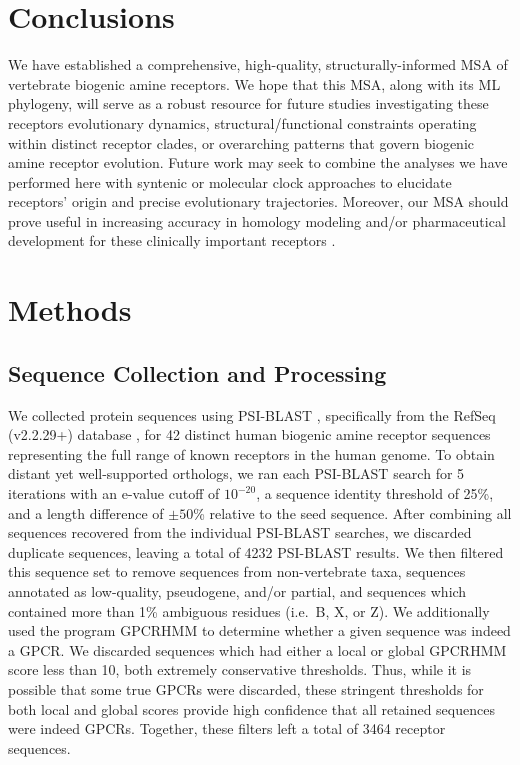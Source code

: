 \documentclass[fleqn,10pt]{wlpeerj}
\begin{document}
\section*{Conclusions}

We have established a comprehensive, high-quality, structurally-informed MSA of vertebrate biogenic amine receptors. We hope that this MSA, along with its ML phylogeny, will serve as a robust resource for future studies investigating these receptors evolutionary dynamics, structural/functional constraints operating within distinct receptor clades, or overarching patterns that govern biogenic amine receptor evolution. Future work may seek to combine the analyses we have performed here with syntenic or molecular clock approaches to elucidate receptors' origin and precise evolutionary trajectories. Moreover, our MSA should prove useful in increasing accuracy in homology modeling and/or pharmaceutical development for these clinically important receptors \citep{Kristiansen2004,Ishiguro2004,Eversetal2005,Masonetal2012}.




\section*{Methods}

\subsection*{Sequence Collection and Processing}
We collected protein sequences using PSI-BLAST \citep{psiblast}, specifically from the RefSeq (v2.2.29+) database \citep{refseq}, for 42 distinct human biogenic amine receptor sequences representing the full range of known receptors in the human genome. To obtain distant yet well-supported orthologs, we ran each PSI-BLAST search for 5 iterations with an e-value cutoff of $10^{-20}$, a sequence identity threshold of 25\%, and a length difference of $\pm50$\% relative to the seed sequence. After combining all sequences recovered from the individual PSI-BLAST searches, we discarded duplicate sequences, leaving a total of 4232 PSI-BLAST results. We then filtered this sequence set to remove sequences from non-vertebrate taxa, sequences annotated as low-quality, pseudogene, and/or partial, and sequences which contained more than 1\% ambiguous residues (i.e.\ B, X, or Z). We additionally used the program GPCRHMM \citep{Wistrand2006} to determine whether a given sequence was indeed a GPCR. We discarded sequences which had either a local or global GPCRHMM score less than 10, both extremely conservative thresholds. Thus, while it is possible that some true GPCRs were discarded, these stringent thresholds for both local and global scores provide high confidence that all retained sequences were indeed GPCRs. Together, these filters left a total of 3464 receptor sequences.
\end{document}
